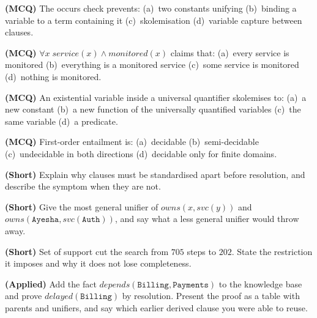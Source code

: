 \begin{reviewq}
  \item \textbf{(MCQ)} The occurs check prevents: (a)~two constants unifying
        (b)~binding a variable to a term containing it (c)~skolemisation
        (d)~variable capture between clauses.
  \item \textbf{(MCQ)} $\forall x \; \mathit{service}(x) \wedge
        \mathit{monitored}(x)$ claims that: (a)~every service is monitored
        (b)~everything is a monitored service (c)~some service is monitored
        (d)~nothing is monitored.
  \item \textbf{(MCQ)} An existential variable inside a universal quantifier
        skolemises to: (a)~a new constant (b)~a new function of the universally
        quantified variables (c)~the same variable (d)~a predicate.
  \item \textbf{(MCQ)} First-order entailment is: (a)~decidable
        (b)~semi-decidable (c)~undecidable in both directions (d)~decidable only
        for finite domains.
  \item \textbf{(Short)} Explain why clauses must be standardised apart before
        resolution, and describe the symptom when they are not.
  \item \textbf{(Short)} Give the most general unifier of
        $\mathit{owns}(x, \mathit{svc}(y))$ and
        $\mathit{owns}(\texttt{Ayesha}, \mathit{svc}(\texttt{Auth}))$, and say what
        a less general unifier would throw away.
  \item \textbf{(Short)} Set of support cut the search from $705$ steps to $202$.
        State the restriction it imposes and why it does not lose completeness.
  \item \textbf{(Applied)} Add the fact $\mathit{depends}(\texttt{Billing},
        \texttt{Payments})$ to the knowledge base and prove
        $\mathit{delayed}(\texttt{Billing})$ by resolution. Present the proof as a
        table with parents and unifiers, and say which earlier derived clause you
        were able to reuse.
\end{reviewq}
